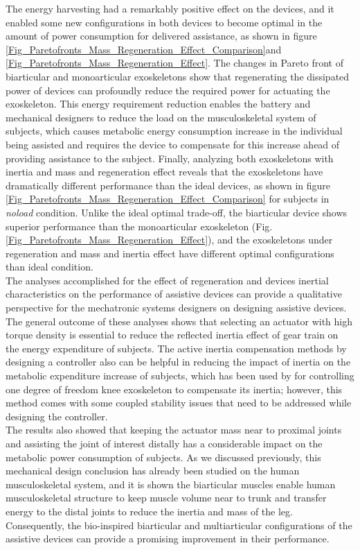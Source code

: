 \documentclass[10pt,letterpaper]{article}
\begin{document}
The energy harvesting had a remarkably positive effect on the devices, and it enabled some new configurations in both devices to become optimal in the amount of power consumption for delivered assistance, as shown in figure \ref{Fig_Paretofronts_Mass_Regeneration_Effect_Comparison}and \ref{Fig_Paretofronts_Mass_Regeneration_Effect}. The changes in Pareto front of biarticular and monoarticular exoskeletons show that regenerating the dissipated power of devices can profoundly reduce the required power for actuating the exoskeleton. This energy requirement reduction enables the battery and mechanical designers to reduce the load on the musculoskeletal system of subjects, which causes metabolic energy consumption increase in the individual being assisted and requires the device to compensate for this increase ahead of providing assistance to the subject. Finally, analyzing both exoskeletons with inertia and mass and regeneration effect reveals that the exoskeletons have dramatically different performance than the ideal devices, as shown in figure \ref{Fig_Paretofronts_Mass_Regeneration_Effect_Comparison}  for subjects in {\it noload} condition. Unlike the ideal optimal trade-off, the biarticular device shows superior performance than the monoarticular exoskeleton (Fig. \ref{Fig_Paretofronts_Mass_Regeneration_Effect}), and the exoskeletons under regeneration and mass and inertia effect have different optimal configurations than ideal condition.\\
The analyses accomplished for the effect of regeneration and devices inertial characteristics on the performance of assistive devices can provide a qualitative perspective for the mechatronic systems designers on designing assistive devices. The general outcome of these analyses shows that selecting an actuator with high torque density is essential to reduce the reflected inertia effect of gear train on the energy expenditure of subjects. The active inertia compensation methods by designing a controller also can be helpful in reducing the impact of inertia on the metabolic expenditure increase of subjects, which has been used by \cite{148} for controlling one degree of freedom knee exoskeleton to compensate its inertia; however, this method comes with some coupled stability issues \cite{146,147,148} that need to be addressed while designing the controller.\\
The results  also showed that keeping the actuator mass near to proximal joints and assisting the joint of interest distally has a considerable impact on the metabolic power consumption of subjects. As we discussed previously, this mechanical design conclusion has already been studied on the human musculoskeletal system, and it is shown the biarticular muscles enable human musculoskeletal structure to keep muscle volume near to trunk and transfer energy to the distal joints to reduce the inertia and mass of the leg. Consequently, the bio-inspired biarticular and multiarticular configurations of the assistive devices can provide a promising improvement in their performance.\\
\end{document}
